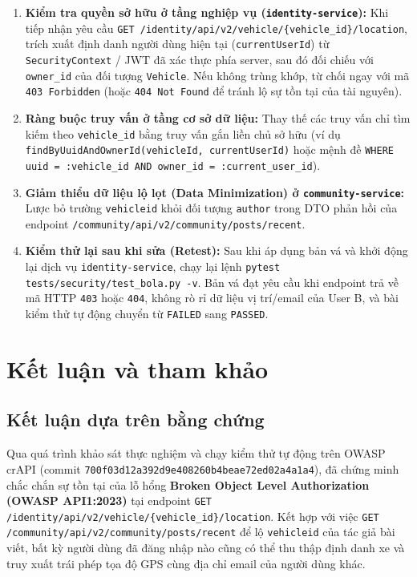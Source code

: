 \documentclass[11pt, a4paper]{article}
\begin{document}
\begin{enumerate}
    \item \textbf{Kiểm tra quyền sở hữu ở tầng nghiệp vụ (\texttt{identity-service}):} Khi tiếp nhận yêu cầu \texttt{GET /identity/api/v2/vehicle/\{vehicle\_id\}/location}, trích xuất định danh người dùng hiện tại (\texttt{currentUserId}) từ \texttt{SecurityContext} / JWT đã xác thực phía server, sau đó đối chiếu với \texttt{owner\_id} của đối tượng \texttt{Vehicle}. Nếu không trùng khớp, từ chối ngay với mã \texttt{403 Forbidden} (hoặc \texttt{404 Not Found} để tránh lộ sự tồn tại của tài nguyên).
    \item \textbf{Ràng buộc truy vấn ở tầng cơ sở dữ liệu:} Thay thế các truy vấn chỉ tìm kiếm theo \texttt{vehicle\_id} bằng truy vấn gắn liền chủ sở hữu (ví dụ \texttt{findByUuidAndOwnerId(vehicleId, currentUserId)} hoặc mệnh đề \texttt{WHERE uuid = :vehicle\_id AND owner\_id = :current\_user\_id}).
    \item \textbf{Giảm thiểu dữ liệu lộ lọt (Data Minimization) ở \texttt{community-service}:} Lược bỏ trường \texttt{vehicleid} khỏi đối tượng \texttt{author} trong DTO phản hồi của endpoint \texttt{/community/api/v2/community/posts/recent}.
    \item \textbf{Kiểm thử lại sau khi sửa (Retest):} Sau khi áp dụng bản vá và khởi động lại dịch vụ \texttt{identity-service}, chạy lại lệnh \texttt{pytest tests/security/test\_bola.py -v}. Bản vá đạt yêu cầu khi endpoint trả về mã HTTP \texttt{403} hoặc \texttt{404}, không rò rỉ dữ liệu vị trí/email của User B, và bài kiểm thử tự động chuyển từ \texttt{FAILED} sang \texttt{PASSED}.
\end{enumerate}

\section{Kết luận và tham khảo}

\subsection{Kết luận dựa trên bằng chứng}

Qua quá trình khảo sát thực nghiệm và chạy kiểm thử tự động trên OWASP crAPI (commit \texttt{700f03d12a392d9e408260b4beae72ed02a4a1a4}), đã chứng minh chắc chắn sự tồn tại của lỗ hổng \textbf{Broken Object Level Authorization (OWASP API1:2023)} tại endpoint \texttt{GET /identity/api/v2/vehicle/\{vehicle\_id\}/location}. Kết hợp với việc \texttt{GET /community/api/v2/community/posts/recent} để lộ \texttt{vehicleid} của tác giả bài viết, bất kỳ người dùng đã đăng nhập nào cũng có thể thu thập định danh xe và truy xuất trái phép tọa độ GPS cùng địa chỉ email của người dùng khác.
\end{document}
